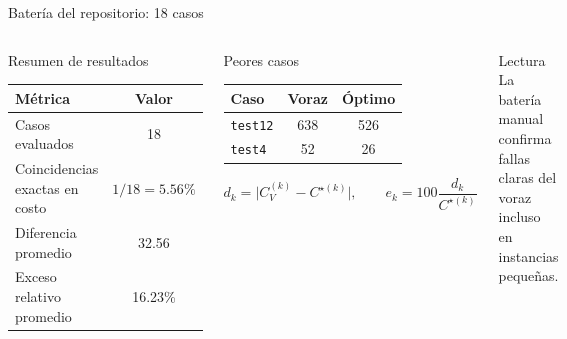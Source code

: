 \documentclass[aspectratio=169]{beamer}
\begin{document}
\begin{frame}{Bater\'ia del repositorio: 18 casos}
  \begin{columns}[T,onlytextwidth]
    \small
    \begin{block}{Resumen de resultados}
      \begin{tabular}{@{}lc@{}}
        \toprule
        M\'etrica & Valor \\
        \midrule
        Casos evaluados & 18 \\
        Coincidencias exactas en costo & \(1/18=5.56\%\) \\
        Diferencia promedio & 32.56 \\
        Exceso relativo promedio & 16.23\% \\
        \bottomrule
      \end{tabular}
    \end{block}

    \small
    \begin{block}{Peores casos}
      \begin{tabular}{@{}lcc@{}}
        \toprule
        Caso & Voraz & \'Optimo \\
        \midrule
        \texttt{test12} & 638 & 526 \\
        \texttt{test4} & 52 & 26 \\
        \bottomrule
      \end{tabular}
      \[
      d_k=\lvert C_V^{(k)}-C^{\star(k)}\rvert,
      \qquad
      e_k=100\frac{d_k}{C^{\star(k)}}
      \]
    \end{block}

    \begin{alertblock}{Lectura}
      La bater\'ia manual confirma fallas claras del voraz incluso en instancias peque\~nas.
    \end{alertblock}
  \end{columns}
\end{frame}
\end{document}

